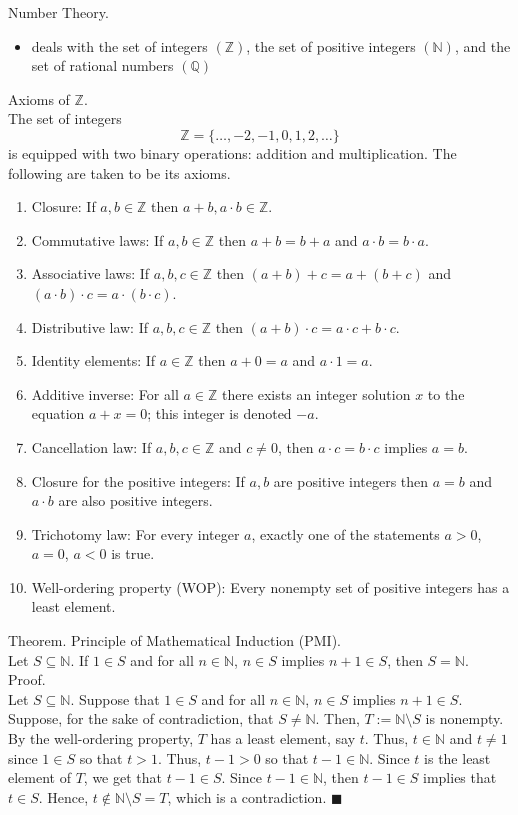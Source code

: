 \documentclass[twocolumn]{article}
\newcommand{\qed}{$\blacksquare$}
\newcommand{\br}{\vspace{\baselineskip}}
\newcommand{\naturals}{\mathbb{N}}
\newcommand{\integers}{\mathbb{Z}}
\newcommand{\rationals}{\mathbb{Q}}
\begin{document}
Number Theory.
\begin{itemize}
	\item
		deals with the set of integers $(\integers)$, the set of positive integers $(\naturals)$, and the set of rational numbers $(\rationals)$
\end{itemize} \br

Axioms of $\integers$. \\
The set of integers
$$\integers = \{ \ldots, -2, -1, 0, 1, 2, \ldots \}$$
is equipped with two binary operations: addition and multiplication. The following are taken to be its axioms.
\begin{enumerate}
	\item
		Closure: If $a, b \in \integers$ then $a + b, a \cdot b \in \integers$.
	\item
		Commutative laws: If $a, b \in \integers$ then $a + b = b + a$ and $a \cdot b = b \cdot a$.
	\item
		Associative laws: If $a, b, c \in \integers$ then $(a + b) + c = a + (b + c)$ and $(a \cdot b) \cdot c = a \cdot (b \cdot c)$.
	\item
		Distributive law: If $a, b, c \in \integers$ then $(a + b) \cdot c = a \cdot c + b \cdot c$.
	\item
		Identity elements: If $a \in \integers$ then $a + 0 = a$ and $a \cdot 1 = a$.
	\item
		Additive inverse: For all $a \in \integers$ there exists an integer solution $x$ to the equation $a + x = 0$; this integer is denoted $-a$.
	\item
		Cancellation law: If $a, b, c \in \integers$ and $c \neq 0$, then $a \cdot c = b \cdot c$ implies $a = b$.
	\item
		Closure for the positive integers: If $a, b$ are positive integers then $a = b$ and $a \cdot b$ are also positive integers.
	\item
		Trichotomy law: For every integer $a$, exactly one of the statements $a > 0$, $a = 0$, $a < 0$ is true.
	\item
		Well-ordering property (WOP): Every nonempty set of positive integers has a least element.
\end{enumerate} \br

Theorem. Principle of Mathematical Induction (PMI). \\
Let $S \subseteq \naturals$. If $1 \in S$ and for all $n \in \naturals$, $n \in S$ implies $n + 1 \in S$, then $S = \naturals$. \\
Proof. \\
Let $S \subseteq \naturals$. Suppose that $1 \in S$ and for all $n \in \naturals$, $n \in S$ implies $n + 1 \in S$. Suppose, for the sake of contradiction, that $S \neq \naturals$. Then, $T := \naturals \setminus S$ is nonempty. By the well-ordering property, $T$ has a least element, say $t$. Thus, $t \in \naturals$ and $t \neq 1$ since $1 \in S$ so that $t > 1$. Thus, $t - 1 > 0$ so that $t - 1 \in \naturals$. Since $t$ is the least element of $T$, we get that $t - 1 \in S$. Since $t - 1 \in \naturals$, then $t - 1 \in S$ implies that $t \in S$. Hence, $t \not\in \naturals \setminus S = T$, which is a contradiction. \qed \\
\end{document}
